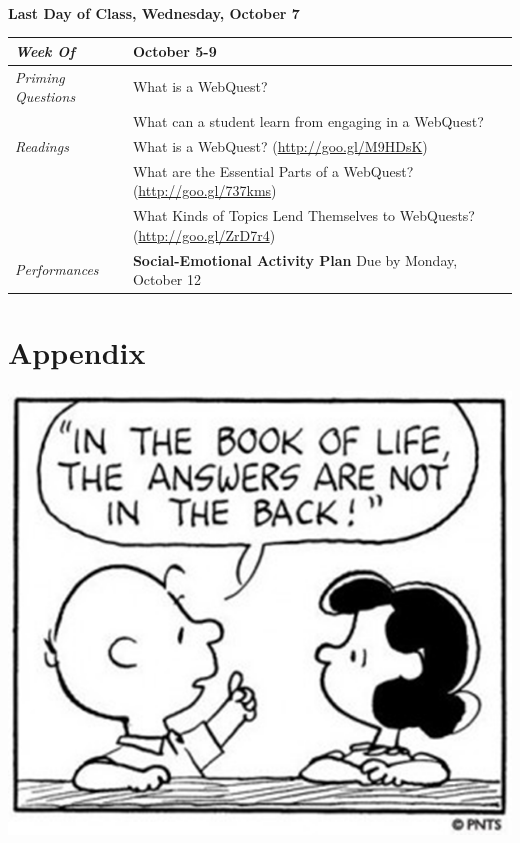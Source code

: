 \documentclass[two-side]{tufte-handout}
\newcommand{\tabpq}{\faQuestionCircle\medspace\textit{Priming Questions}}
\newcommand{\tabread}{\faBook\medspace\textit{Readings}}
\newcommand{\tabperformance}{\faTasks\medspace\textit{Performances}}
\newcommand{\tabdt}{\faCalendar\medspace\textit{Week Of}}
\newcommand{\tabbreak}{\begin{fullwidth}\begin{center}\faAsterisk\faAsterisk\faAsterisk\\\end{center}\end{fullwidth}}
\newenvironment{tabsched}
	{\small
	\begin{tabular}{p{1.5in}p{4.5in}}
	\midrule}
	{\midrule
	\end{tabular}
	\normalsize}
\newcommand{\weekeight}{October 5-9}
\newcommand{\finisemester}{\begin{fullwidth}\begin{center}\large\textbf{\faFlagCheckered Last Day of Class, Wednesday, October 7 \faFlagCheckered}\normalsize\end{center}\end{fullwidth}}
\begin{document}
\tabbreak

\newpage

\finisemester

\begin{tabsched}
	\tabdt & \weekeight \\
	\midrule
	\tabpq & What is a WebQuest? \\
	& What can a student learn from engaging in a WebQuest? \\
	\midrule
	\tabread &  What is a WebQuest? (\url{http://goo.gl/M9HDsK}) \\
	& What are the Essential Parts of a WebQuest? (\url{http://goo.gl/737kms}) \\
	& What Kinds of Topics Lend Themselves to WebQuests? (\url{http://goo.gl/ZrD7r4}) \\
	\midrule
	\tabperformance & \textbf{Social-Emotional Activity Plan} Due by Monday, October 12 \\
\end{tabsched}

\newpage

\part{Appendix}

\begin{marginfigure}%
	\begin{center}
		\includegraphics[width=1\linewidth]{ap-pic.png}
	\end{center}
\end{marginfigure}


\end{document}
